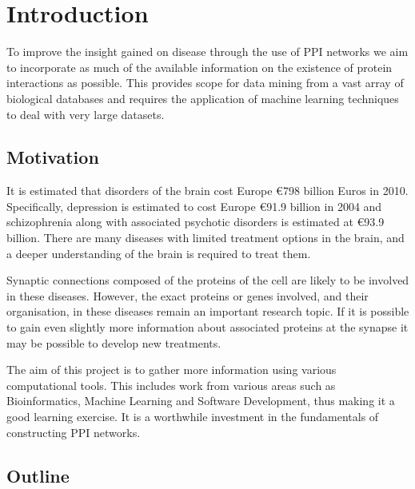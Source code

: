 \chapter{Introduction}
\label{introduction}

To improve the insight gained on disease through the use of \ac{PPI} networks we aim to incorporate as much of the available information on the existence of protein interactions as possible.
This provides scope for data mining from a vast array of biological databases and requires the application of machine learning techniques to deal with very large datasets.

\section{Motivation}

It is estimated that disorders of the brain cost Europe €798 billion Euros in 2010\autocite{olesen_economic_2012}.
Specifically, depression is estimated to cost Europe €91.9 billion in 2004 and schizophrenia along with associated psychotic disorders is estimated at €93.9 billion.
There are many diseases with limited treatment options in the brain, and a deeper understanding of the brain is required to treat them. 

Synaptic connections composed of the proteins of the cell are likely to be involved in these diseases\autocites{chua_architecture_2010,synsys}.
However, the exact proteins or genes involved, and their organisation, in these diseases remain an important research topic.
If it is possible to gain even slightly more information about associated proteins at the synapse it may be possible to develop new treatments\autocite{li_interaction_2010}.

The aim of this project is to gather more information using various computational tools.
This includes work from various areas such as Bioinformatics, Machine Learning and Software Development, thus making it a good learning exercise. %
It is a worthwhile investment in the fundamentals of constructing \ac{PPI} networks. %

\section{Outline}

